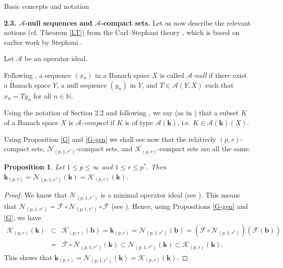 \documentclass[a4paper,11pt]{amsart}
\newtheorem{prop}{Proposition}[section]
\theoremstyle{definition}
\theoremstyle{definition}
\theoremstyle{definition}
\begin{document}
\begin{section}{Basic concepts and notation}
\bigskip

{\bf 2.3. ${{\mathcal A}}$-null sequences and ${{\mathcal A}}$-compact sets.} Let us now describe the relevant notions (cf. Theorem \ref{LT}) from the Carl--Stephani theory \cite{CS}, which is based on earlier work by Stephani \cite{S72, S73, S3}.

Let ${{\mathcal A}}$ be an operator ideal.

Following \cite[Lemma~1.2]{CS}, a sequence $(x_n)$ in a Banach space $X$ is called \emph{${{\mathcal A}}$-null} if there exist a Banach space $Y$, a null sequence $(y_n)$ in $Y$, and $T\in{{\mathcal A}}(Y, X)$ such that $x_n =T y_n$ for all $n \in {{\mathbb N}}$.

Using the notation of Section 2.2 and following \cite[Theorem 1.2]{CS}, we say (as in \cite{LT}) that a subset $K$ of a Banach space $X$ is \emph{${{\mathcal A}}$-compact} if $K$ is of type ${{\mathcal A}}({\boldsymbol{k}})$, i.e. $K\in {{\mathcal A}}({\boldsymbol{k}}) (X)$. 

Using Proposition \ref{G} and \ref{G-gen} we shall see now that the relatively ${{(p,r)}}$-compact sets, ${{\mathcal N}}_{(p,1,{r^{\ast}})}$-compact sets, and ${{\mathcal K}}_{{(p,r)}}$-compact sets are all the same.
\begin{prop}\label{prop3.1}
Let $1\leq p \leq \infty$ and $1\leq r \leq {p^{\ast}}$. Then ${\boldsymbol{k}} _{{(p,r)}} = {{\mathcal N}}_{(p,1,{r^{\ast}})}({\boldsymbol{k}})= {{\mathcal K}}_{{(p,r)}} ({\boldsymbol{k}})$.
\end{prop}
\begin{proof}
We know that ${{\mathcal N}}_{(p,1,{r^{\ast}})}$ is a minimal operator ideal (see \cite[18.1.4]{P}). This means that ${{\mathcal N}}_{(p,1,{r^{\ast}})}= \overline {{\mathcal F}} \circ {{\mathcal N}}_{(p,1,{r^{\ast}})} \circ \overline {{\mathcal F}}$ (see \cite[4.8.6]{P}). Hence, using Propositions \ref{G-gen} and \ref{G}, we have
\begin{eqnarray*}
{{\mathcal K}}_{{(p,r)}} ({\boldsymbol{k}})& \subset & {{\mathcal K}}_{{(p,r)}} ({\boldsymbol{b}}) = {\boldsymbol{k}}_{{(p,r)}} = {{\mathcal N}}_{(p,1,{r^{\ast}})}({\boldsymbol{b}})= (\overline {{\mathcal F}} \circ {{\mathcal N}}_{(p,1,{r^{\ast}})})(\overline {{\mathcal F}} ({\boldsymbol{b}}))\\
&=& \overline {{\mathcal F}} \circ {{\mathcal N}}_{(p,1,{r^{\ast}})}({\boldsymbol{k}})\subset {{\mathcal N}}_{(p,1,{r^{\ast}})}({\boldsymbol{k}}) \subset {{\mathcal K}}_{{(p,r)}} ({\boldsymbol{k}}).
\end{eqnarray*}
This shows that ${\boldsymbol{k}} _{{(p,r)}} = {{\mathcal N}}_{(p,1,{r^{\ast}})}({\boldsymbol{k}})= {{\mathcal K}}_{{(p,r)}} ({\boldsymbol{k}})$.
\end{proof}


\end{section}
\end{document}
